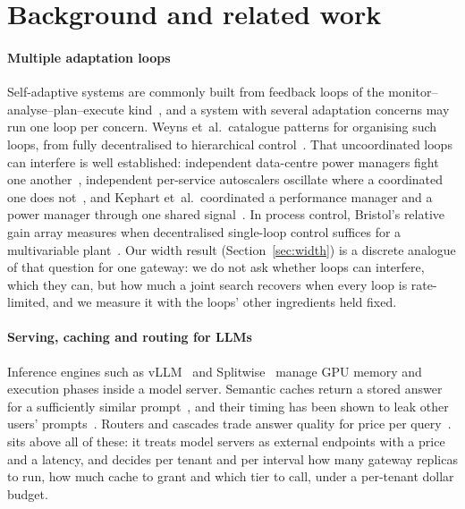 \section{Background and related work}
\label{sec:related}

\paragraph{Multiple adaptation loops}
Self-adaptive systems are commonly built from feedback loops of the
monitor--analyse--plan--execute kind~\cite{kephart2003}, and a system with
several adaptation concerns may run one loop per concern. Weyns
et~al.\ catalogue patterns for organising such loops, from fully
decentralised to hierarchical control~\cite{weyns2013}. That uncoordinated
loops can interfere is well established: independent data-centre power
managers fight one another~\cite{nopowerstruggles}, independent
per-service autoscalers oscillate where a coordinated one does
not~\cite{chamulteon}, and Kephart et~al.\ coordinated a performance
manager and a power manager through one shared signal~\cite{kephart2007}.
In process control, Bristol's relative gain array measures when
decentralised single-loop control suffices for a multivariable
plant~\cite{bristol1966}. Our width result (Section~\ref{sec:width}) is a
discrete analogue of that question for one gateway: we do not ask whether
loops can interfere, which they can, but how much a joint search recovers
when every loop is rate-limited, and we measure it with the loops' other
ingredients held fixed.

\paragraph{Serving, caching and routing for LLMs}
Inference engines such as vLLM~\cite{vllm} and Splitwise~\cite{splitwise}
manage GPU memory and execution phases inside a model server. Semantic
caches return a stored answer for a sufficiently similar
prompt~\cite{gptcache}, and their timing has been shown to leak other
users' prompts~\cite{earlybird}. Routers and cascades trade answer quality
for price per query~\cite{frugalgpt,routellm}. \polyforge{} sits above all
of these: it treats model servers as external endpoints with a price and a
latency, and decides per tenant and per interval how many gateway replicas
to run, how much cache to grant and which tier to call, under a per-tenant
dollar budget.

